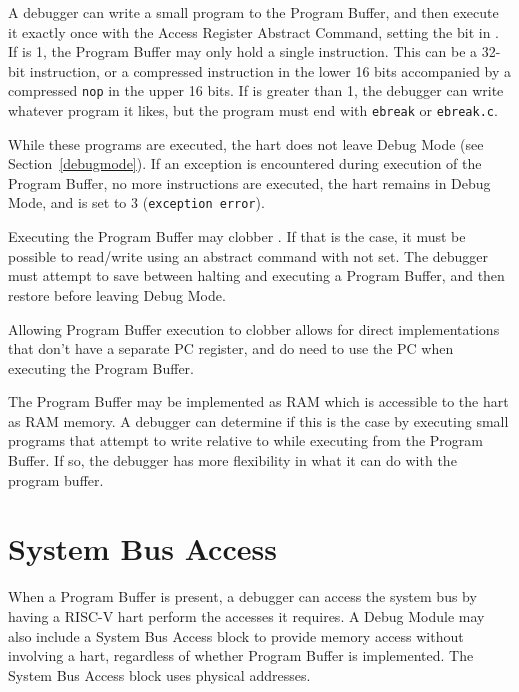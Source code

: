 A debugger can write a small program to the Program Buffer, and then
execute it exactly once with the Access Register Abstract Command,
setting the \Fpostexec bit in \Rcommand.
If \Fprogbufsize is 1, the Program Buffer may only hold a single instruction.
This can be a 32-bit
instruction, or a compressed instruction in the lower 16 bits accompanied by a
compressed {\tt nop} in the upper 16 bits.  If \Fprogbufsize is greater than 1,
the debugger can write whatever program it likes, but the program must end with
{\tt ebreak} or {\tt ebreak.c}.

While these programs are executed, the hart does not leave Debug Mode (see
Section~\ref{debugmode}).  If an exception is encountered during execution of
the Program Buffer, no more instructions are executed, the hart remains in Debug
Mode, and \Fcmderr is set to 3 ({\tt exception error}).

Executing the Program Buffer may clobber \Rdpc. If that is the case, it must be
possible to read/write \Rdpc using an abstract command with \Fpostexec not set.
The debugger must attempt to save \Rdpc between halting and
executing a Program Buffer, and then restore \Rdpc before leaving Debug Mode.

\begin{commentary}
    Allowing Program Buffer execution to clobber \Rdpc allows for direct
    implementations that don't have a separate PC register, and do need to use
    the PC when executing the Program Buffer.
\end{commentary}

The Program Buffer may be implemented as RAM which is accessible to the
hart as RAM memory. A debugger can determine if this is the case by executing small
programs that attempt to write relative to \Rpc while executing from the Program Buffer.
If so, the debugger has more flexibility in what it can do with the program buffer.

\section{System Bus Access} \label{systembusaccess}

When a Program Buffer is present, a debugger can access the system bus by having a
RISC-V hart perform the accesses it requires.
A Debug Module may also include a System Bus Access block to provide memory
access without
involving a hart, regardless of whether Program Buffer is implemented.
The System Bus Access block uses physical addresses.

